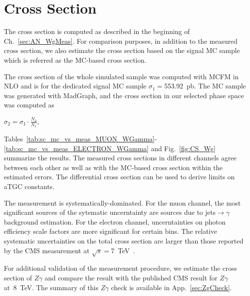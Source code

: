 \section{Cross Section}
\label{sec:AN_CrossSection}

The cross section is computed as described in the beginning of Ch.~\ref{sec:AN_WgMeas}. For comparison purposes, in addition to the measured cross section, we also estimate the cross section based on the signal MC sample which is referred as the MC-based cross section.

The cross section of the whole simulated sample was computed with MCFM in NLO and is for the dedicated signal MC sample $\sigma_1=$553.92~pb. The MC sample was generated with MadGraph, and the cross section in our selected phase space was computed as 

\begin{center}
$\sigma_2 = \sigma_1 \cdot \frac{N_2}{N_1}$, 
\end{center} 



Tables~\ref{tab:sc_mc_vs_meas_MUON_WGamma}-\ref{tab:sc_mc_vs_meas_ELECTRON_WGamma} and Fig.~\ref{fig:CS_Wg} summarize the results. The measured cross sections in different channels agree between each other as well as with the MC-based cross section within the estimated errors. The differential cross section can be used to derive limits on aTGC constants.

The measurement is systematically-dominated. For the muon channel, the most significant sources of the sytematic uncerntainty are sources due to jets$\rightarrow\gamma$ background estimation. For the electron channel, uncerntainties on photon efficiency scale factors are more significant for certain bins. The relative systematic uncertainties on the total cross section are larger than those reported by the CMS measurement at $\sqrt{s}=$7~TeV~\cite{ref_7TeV_CMS}.

For additional validation of the measurement procedure, we estimate the cross section of $Z\gamma$ and compare the result with the published CMS result for $Z\gamma$ at~8~TeV. The summary of this $Z\gamma$ check is available in App.~\ref{sec:ZgCheck}.

